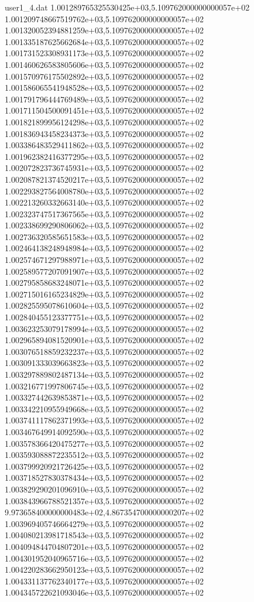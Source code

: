 \begin{filecontents}{user1_4.dat}
1.001289765325530425e+03,5.109762000000000057e+02
1.001209748667519762e+03,5.109762000000000057e+02
1.001320052394881259e+03,5.109762000000000057e+02
1.001335187625662684e+03,5.109762000000000057e+02
1.001731523308931173e+03,5.109762000000000057e+02
1.001460626583805606e+03,5.109762000000000057e+02
1.001570976175502892e+03,5.109762000000000057e+02
1.001586065541948528e+03,5.109762000000000057e+02
1.001791796444769489e+03,5.109762000000000057e+02
1.001711504500091451e+03,5.109762000000000057e+02
1.001821899956124298e+03,5.109762000000000057e+02
1.001836943458234373e+03,5.109762000000000057e+02
1.003386483529411862e+03,5.109762000000000057e+02
1.001962382416377295e+03,5.109762000000000057e+02
1.002072823736745931e+03,5.109762000000000057e+02
1.002087821374520217e+03,5.109762000000000057e+02
1.002293827564008780e+03,5.109762000000000057e+02
1.002213260332663140e+03,5.109762000000000057e+02
1.002323747517367565e+03,5.109762000000000057e+02
1.002338699290806062e+03,5.109762000000000057e+02
1.002736320585651583e+03,5.109762000000000057e+02
1.002464138248948984e+03,5.109762000000000057e+02
1.002574671297988971e+03,5.109762000000000057e+02
1.002589577207091907e+03,5.109762000000000057e+02
1.002795858683248071e+03,5.109762000000000057e+02
1.002715016165234829e+03,5.109762000000000057e+02
1.002825595078610604e+03,5.109762000000000057e+02
1.002840455123377751e+03,5.109762000000000057e+02
1.003623253079178994e+03,5.109762000000000057e+02
1.002965894081520901e+03,5.109762000000000057e+02
1.003076518859232237e+03,5.109762000000000057e+02
1.003091333039663823e+03,5.109762000000000057e+02
1.003297889802487134e+03,5.109762000000000057e+02
1.003216771997806745e+03,5.109762000000000057e+02
1.003327442639853871e+03,5.109762000000000057e+02
1.003342210955949668e+03,5.109762000000000057e+02
1.003741117862371993e+03,5.109762000000000057e+02
1.003467649914092590e+03,5.109762000000000057e+02
1.003578366420475277e+03,5.109762000000000057e+02
1.003593088872235512e+03,5.109762000000000057e+02
1.003799920921726425e+03,5.109762000000000057e+02
1.003718527830378434e+03,5.109762000000000057e+02
1.003829290201096910e+03,5.109762000000000057e+02
1.003843966788521357e+03,5.109762000000000057e+02
9.973658400000000483e+02,4.867354700000000207e+02
1.003969405746664279e+03,5.109762000000000057e+02
1.004080213981718543e+03,5.109762000000000057e+02
1.004094844704807201e+03,5.109762000000000057e+02
1.004301952040965716e+03,5.109762000000000057e+02
1.004220283662950123e+03,5.109762000000000057e+02
1.004331137762340177e+03,5.109762000000000057e+02
1.004345722621093046e+03,5.109762000000000057e+02

\end{filecontents}
